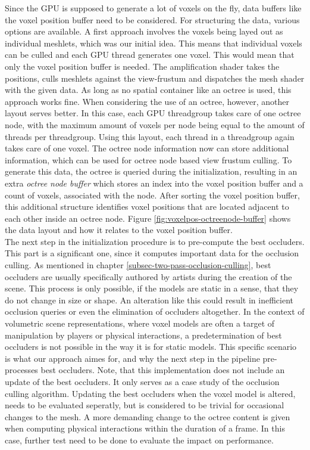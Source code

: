 \noindent
Since the \ac{GPU} is supposed to generate a lot of voxels on the fly, data buffers like the voxel position buffer 
need to be considered.
For structuring the data, various options are available. A first approach involves the voxels being layed 
out as individual meshlets, which was our initial idea. This means that individual voxels can be culled and 
each \ac{GPU} thread generates one voxel. This would mean that only the voxel position buffer is needed. 
The amplification shader takes the positions, culls meshlets against the view-frustum and dispatches the 
mesh shader with the given data. As long as no spatial container like an octree is used, this approach works 
fine. When considering the use of an octree, however, another layout serves better. In this case, each \ac{GPU} 
threadgroup takes care of one octree node, with the maximum amount of voxels per node being equal to the 
amount of threads per threadgroup. Using this layout, each thread in a threadgroup again takes care of one 
voxel. The octree node information now can store additional information, which can be used for octree node 
based view frustum culling. To generate this data, the octree is queried during the initialization, resulting 
in an extra \emph{octree node buffer} which stores an index into the voxel position buffer and a count of voxels,
associated with the node. After sorting the voxel position buffer, this additional structure identifies voxel 
positions that are located adjacent to each other inside an octree node. Figure \ref{fig:voxelpos-octreenode-buffer} 
shows the data layout and how it relates to the voxel position buffer. \\

\noindent
The next step in the initialization procedure is to pre-compute the best occluders. This part is a significant one, 
since it computes important data for the occlusion culling. As mentioned in chapter \ref{subsec-two-pass-occlusion-culling},
best occluders are usually specifically authored by artists during the creation of the scene. This process is only 
possible, if the models are static in a sense, that they do not change in size or shape. An alteration like this 
could result in inefficient occlusion queries or even the elimination of occluders altogether. In the context of 
volumetric scene representations, where voxel models are often a target of manipulation by players or physical 
interactions, a predetermination of best occluders is not possible in the way it is for static models.
This specific scenario is what our approach aimes for, and why the next step in the pipeline pre-processes best 
occluders. Note, that this implementation does not include an update of the best occluders. It only serves as a 
case study of the occlusion culling algorithm. Updating the best occluders when the voxel model is altered, 
needs to be evaluated seperatly, but is considered to be trivial for occasional changes to the mesh. A more 
demanding change to the octree content is given when computing physical interactions within the duration of a frame.
In this case, further test need to be done to evaluate the impact on performance. \\

